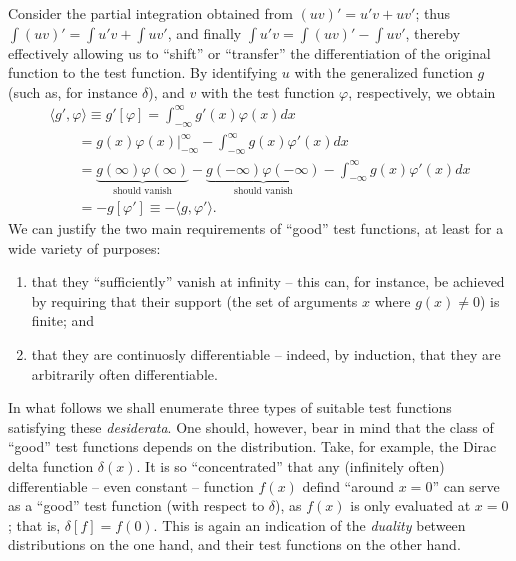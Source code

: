 Consider the partial integration
obtained from $(uv)' = u'v+uv'$; thus
$\int (uv)' = \int u'v+\int uv'$,
and finally   $\int u'v = \int (uv)'  -\int uv'$,
thereby effectively allowing us to ``shift'' or ``transfer''
the differentiation of the original function to the test function.
By identifying $u$ with the generalized function $g$ (such as, for instance  $\delta$),
and $v$ with the test function $\varphi$, respectively, we obtain
\begin{equation}
\begin{split}
\langle g' ,    \varphi  \rangle
\equiv
g'[\varphi] =
\int_{-\infty}^\infty
g'(x)\varphi(x)
dx      \\
\qquad
=
\left.
g(x)\varphi(x)\right|_{-\infty}^\infty
-  \int_{-\infty}^\infty
g(x)\varphi'(x)
dx           \\
\qquad
=
\underbrace{g(\infty)\varphi(\infty)}_{\textrm{should vanish}} - \underbrace{g(-\infty)\varphi(-\infty)}_{\textrm{should vanish}}
-  \int_{-\infty}^\infty
g(x)\varphi'(x)
dx  \\
\qquad
= - g[\varphi'] \equiv   -   \langle g ,    \varphi'  \rangle
.
\end{split}
\label{2012-m-ch-di-desiderata}
\end{equation}
We can justify the two main requirements of ``good'' test functions, at least for a wide variety of purposes:
\begin{enumerate}
\item
that they ``sufficiently'' vanish at infinity -- this can, for instance, be achieved by requiring that their support
(the set of arguments $x$ where $g(x)\neq 0$) is finite; and
\item
that they are continuosly differentiable -- indeed, by induction, that they are arbitrarily often differentiable.
\end{enumerate}

In what follows we shall enumerate three types of suitable test functions satisfying these {\it desiderata}.
One should, however, bear in mind that the class of ``good'' test functions depends on the distribution.
Take, for example, the Dirac delta function $\delta (x)$. It is so ``concentrated'' that any (infinitely often)
differentiable -- even constant -- function $f(x)$ defind ``around $x=0$''
can serve as a ``good'' test function (with respect to $\delta$),
as $f(x)$ is only evaluated at $x=0$; that is, $\delta[f]=f(0)$.
This is again an indication of the {\em duality} between distributions on the one hand,
and their test functions on the other hand.

